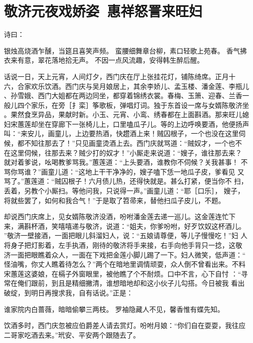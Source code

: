 \chapter{敬济元夜戏娇姿~惠祥怒詈来旺妇}

诗曰：

银烛高烧酒乍醺，当筵且喜笑声频。
蛮腰细舞章台柳，素口轻歌上苑春。
香气拂衣来有意，翠花落地拾无声。
不因一点风流趣，安得韩生醉后醒。

话说一日，天上元宵，人间灯夕，西门庆在厅上张挂花灯，铺陈绮席。正月十
六，合家欢乐饮酒。西门庆与吴月娘居上，其余李娇儿、孟玉楼、潘金莲、李瓶儿
、孙雪娥、西门大姐都在两边同坐，都穿着锦绣衣裳。春梅、玉箫、迎春、兰香一
般儿四个家乐，在旁［扌栾］筝歌板，弹唱灯词。独于东首设一席与女婿陈敬济坐
。果然食烹异品，果献时新。小玉、元宵、小鸾、绣春都在上面斟酒。那来旺儿媳
妇宋蕙莲却坐在穿廊下一张椅儿上，口里嗑瓜子儿。等的上边呼唤要酒，他便扬声
叫：“来安儿，画童儿，上边要热酒，快趱酒上来！贼囚根子，一个也没在这里伺
候，都不知往那去了！”只见画童烫酒上去。西门庆就骂道：“贼奴才，一个也不
在这里伺候，往那去来？贼少打的奴才！”小厮走来说道：“嫂子，谁往那去来？
就对着爹说，吆喝教爹骂我。”蕙莲道：“上头要酒，谁教你不伺候？关我甚事！
不骂你骂谁？”画童儿道：“这地上干干净净的，嫂子嗑下恁一地瓜子皮，爹看见
又骂了。”蕙莲道：“贼囚根子！六月债儿热，还得快就是。甚么打紧，便当你不
扫，丢着，另教个小厮扫。等他问我，只说得一声。”画童儿道：“耶［口乐］，
嫂子，将就些罢了，如何和我合气！”于是取了笤帚来，替他扫瓜子皮儿，不题。

却说西门庆席上，见女婿陈敬济没酒，吩咐潘金莲去递一巡儿。这金莲连忙下
来，满斟杯酒，笑嘻嘻递与敬济，说道：“姐夫，你爹吩咐，好歹饮奴这杯酒儿。
”敬济一壁接酒，一面把眼儿斜溜妇人，说：“五娘请尊便，等儿子慢慢吃！”妇
人将身子把灯影着，左手执酒，刚待的敬济将手来接，右手向他手背只一捻，这敬
济一面把眼瞧着众人，一面在下戏把金莲小脚儿踢了一下。妇人微笑，低声道：“
怪油嘴，你丈人瞧着待怎么？”两个在暗地里调情顽耍，众人倒不曾看出来。不料
宋蕙莲这婆娘，在槅子外窗眼里，被他瞧了个不耐烦。口中不言，心下自忖
：“寻常在俺们跟前，到且是精细撇清，谁想暗地却和这小伙子儿勾搭。今日被我
看出破绽，到明日再搜求我，自有话说。”正是：

谁家院内白蔷薇，暗暗偷攀三两枝。
罗袖隐藏人不见，馨香惟有蝶先知。

饮酒多时，西门庆忽被应伯爵差人请去赏灯。吩咐月娘：“你们自在耍耍，我往应
二哥家吃酒去来。”玳安、平安两个跟随去了。

